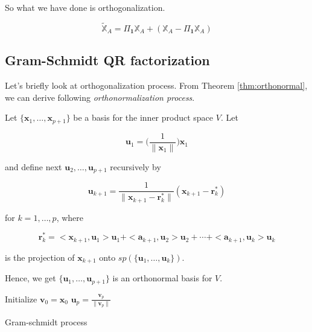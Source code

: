 \documentclass[]{book}
\theoremstyle{definition}
\theoremstyle{definition}
\theoremstyle{definition}
\theoremstyle{remark}
\let\BeginKnitrBlock\begin \let\EndKnitrBlock\end
\begin{document}
So what we have done is orthogonalization.

\[\tilde{\mathbb{X}}_A = \Pi_{\mathbf{1}}\mathbb{X}_A + (\mathbb{X}_A - \Pi_{\mathbf{1}}\mathbb{X}_A)\]

\hypertarget{gram-schmidt-qr-factorization}{%
\subsection{Gram-Schmidt QR factorization}\label{gram-schmidt-qr-factorization}}

Let's briefly look at orthogonalization process. From Theorem \ref{thm:orthonormal}, we can derive following \emph{orthonormalization process}.

\BeginKnitrBlock{theorem}[Gram-Schmidt Process]
\protect\hypertarget{thm:gs}{}{\label{thm:gs} {} }Let \(\{ \mathbf{x}_1, \ldots, \mathbf{x}_{p + 1} \}\) be a basis for the inner product space \(V\). Let

\[\mathbf{u}_1 = \bigg( \frac{1}{\lVert \mathbf{x}_1 \rVert} \bigg) \mathbf{x}_1\]

and define next \(\mathbf{u}_2, \ldots, \mathbf{u}_{p + 1}\) recursively by

\[\mathbf{u}_{k + 1} = \frac{1}{\lVert \mathbf{x}_{k + 1} - \mathbf{r}_k^{*} \rVert}(\mathbf{x}_{k + 1} - \mathbf{r}_k^{*})\]

for \(k = 1, \ldots, p\), where

\[\mathbf{r}_k^{*} = <\mathbf{x}_{k + 1}, \mathbf{u}_1> \mathbf{u}_1 + <\mathbf{a}_{k + 1}, \mathbf{u}_2 >\mathbf{u}_2 + \cdots + < \mathbf{a}_{k + 1}, \mathbf{u}_k > \mathbf{u}_k\]

is the projection of \(\mathbf{x}_{k + 1}\) onto \(sp(\{ \mathbf{u}_1, \ldots, \mathbf{u}_k \})\).

Hence, we get \(\{ \mathbf{u}_1, \ldots, \mathbf{u}_{p + 1} \}\) is an orthonormal basis for \(V\).
\EndKnitrBlock{theorem}

\begin{algorithm} \label{alg:alggs}
  \SetAlgoLined
  Initialize $\mathbf{v}_0 = \mathbf{x}_0$\;
  $\mathbf{u}_p = \frac{\mathbf{v}_p}{\lVert \mathbf{v}_p \rVert}$
  \caption{Gram-schmidt process}
\end{algorithm}
\end{document}
